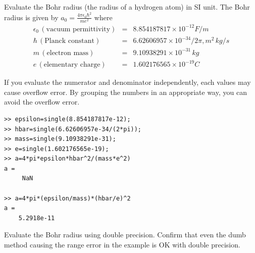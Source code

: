 \begin{example}
    \label{ex:bohr_radius}
\medskip
Evaluate the Bohr radius (the radius of a hydrogen atom)\cite{Griffiths} in SI unit.    The Bohr radius is given by
$a_0 = \displaystyle\frac{4 \pi \epsilon_0 \hbar^2}{m e^2}$ where
\begin{eqnarray*}
\epsilon_0\, (\text{vacuum permittivity}) &=& 8.854187817 \times 10^{-12} F/m\\
\hbar\, (\text{Planck constant}) &=& 6.62606957 \times 10^{-34}/2\pi, m^2\, kg / s \\
m\, (\text{electron mass}) &=& 9.10938291 \times 10^{-31}\, kg\\
e\, (\text{elementary charge}) &=& 1.602176565 \times 10^{-19} C
\end{eqnarray*}

If you evaluate the numerator and denominator independently, each values may cause overflow error. By grouping the numbers in an appropriate way, you can avoid the overflow error.

\small
\begin{mybox}
\begin{verbatim}
>> epsilon=single(8.854187817e-12);
>> hbar=single(6.62606957e-34/(2*pi));
>> mass=single(9.10938291e-31);
>> e=single(1.602176565e-19);
>> a=4*pi*epsilon*hbar^2/(mass*e^2)
a =
     NaN

>> a=4*pi*(epsilon/mass)*(hbar/e)^2
a =
    5.2918e-11
\end{verbatim}
\end{mybox}
\normalsize
\end{example}

\noindent
\exercise
Evaluate the Bohr radius using double precision.  Confirm that even the dumb method causing the range error in the example is OK with double precision.
\vspace{18px}

